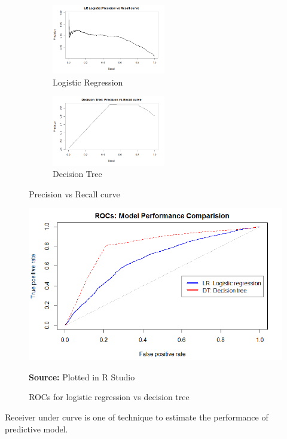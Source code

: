\begin{figure}[t!]
    \centering
    \begin{subfigure}
        \centering
        \includegraphics[height=1.2in]{LRrecall.png}
        \caption{Logistic Regression}
    \end{subfigure}%
    \begin{subfigure}
        \centering
        \includegraphics[height=1.2in]{DRrecall.png}
        \caption{Decision Tree}
    \end{subfigure}
    \caption{Precision vs Recall curve}
\end{figure}


\begin{center}
\begin{figure}[!htb]
\includegraphics[width=\textwidth]{results1.png}
\centering
\caption{ROCs for logistic regression vs decision tree}{\textbf{Source:} Plotted in R Studio}
\label{fig:result}
\end{figure}
\end{center}

Receiver under curve is one of technique to estimate the performance of predictive model.
